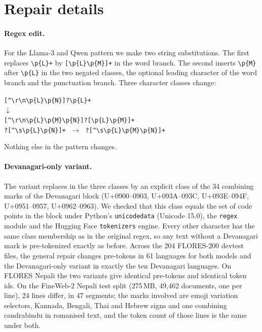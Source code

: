 \section{Repair details}
\label{app:regex}

\paragraph{Regex edit.} For the Llama-3 and Qwen pattern we make two string substitutions. The first replaces \texttt{\textbackslash p\{L\}+} by \texttt{[\textbackslash p\{L\}\textbackslash p\{M\}]+} in the word branch. The second inserts \texttt{\textbackslash p\{M\}} after \texttt{\textbackslash p\{L\}} in the two negated classes, the optional leading character of the word branch and the punctuation branch. Three character classes change:
\begin{center}\small
\texttt{[\textasciicircum\textbackslash r\textbackslash n\textbackslash p\{L\}\textbackslash p\{N\}]?\textbackslash p\{L\}+}\\
$\downarrow$\\
\texttt{[\textasciicircum\textbackslash r\textbackslash n\textbackslash p\{L\}\textbackslash p\{M\}\textbackslash p\{N\}]?[\textbackslash p\{L\}\textbackslash p\{M\}]+}\\[4pt]
\texttt{\textvisiblespace?[\textasciicircum\textbackslash s\textbackslash p\{L\}\textbackslash p\{N\}]+}
$\;\rightarrow\;$
\texttt{\textvisiblespace?[\textasciicircum\textbackslash s\textbackslash p\{L\}\textbackslash p\{M\}\textbackslash p\{N\}]+}
\end{center}
Nothing else in the pattern changes.

\paragraph{Devanagari-only variant.} The variant replaces \pM{} in the three classes by an explicit class of the 34 combining marks of the Devanagari block (U+0900--0903, U+093A--093C, U+093E--094F, U+0951--0957, U+0962--0963). We checked that this class equals the set of \pM{} code points in the block under Python's \texttt{unicodedata} (Unicode 15.0), the \texttt{regex} module and the Hugging Face \texttt{tokenizers} engine. Every other character has the same class membership as in the original regex, so any text without a Devanagari mark is pre-tokenized exactly as before. Across the 204 FLORES-200 devtest files, the general repair changes pre-tokens in 61 languages for both models and the Devanagari-only variant in exactly the ten Devanagari languages. On FLORES Nepali the two variants give identical pre-tokens and identical \RII{} token ids. On the FineWeb-2 Nepali test split (275\,MB, 49{,}462 documents, one per line), 24 lines differ, in 47 segments; the marks involved are emoji variation selectors, Kannada, Bengali, Thai and Hebrew signs and one combining candrabindu in romanised text, and the \RII{} token count of those lines is the same under both.

